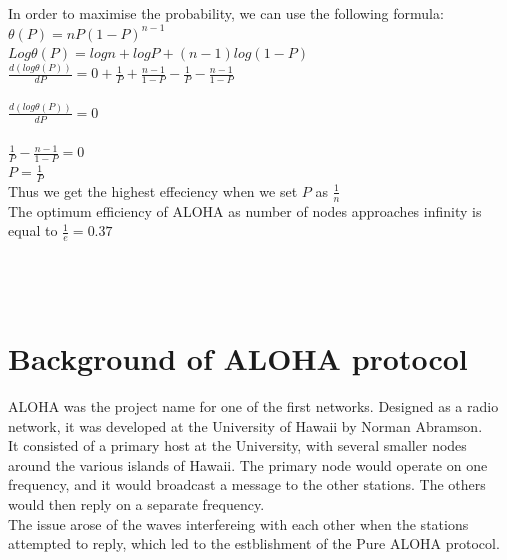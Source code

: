 \documentclass{article}
\begin{document}
In order to maximise the probability, we can use the following formula:\\
$\theta(P) =nP(1-P)^{n-1}$\\
$Log \theta(P)=log n+ log P + (n-1)log (1-P)$\\
$\frac{d(log\theta(P))}{dP} = 0+\frac{1}{P}+\frac{n-1}{1-P}-\frac{1}{P}-\frac{n-1}{1-P}$\\
\\
$\frac{d(log\theta(P))}{dP} = 0$\\
\\
$\frac{1}{P} - \frac{n-1}{1-P} = 0$\\
$P = \frac{1}{P}$\\
Thus we get the highest effeciency when we set $P$ as $\frac{1}{n}$\\
The optimum efficiency of ALOHA as number of nodes approaches infinity is equal to $\frac{1}{e} = 0.37$
\\
\\
\\
\\
\section{Background of ALOHA protocol}
ALOHA was the project name for one of the first networks. Designed as a radio network, it was developed at the University of Hawaii by Norman Abramson.\\
It consisted of a primary host at the University, with several smaller nodes around the various islands of Hawaii. The primary node would operate on one frequency, and it would broadcast a message to the other stations. The others would then reply on a separate frequency.\\
The issue arose of the waves interfereing with each other when the stations attempted to reply, which led to the estblishment of the Pure ALOHA protocol.
\end{document}
